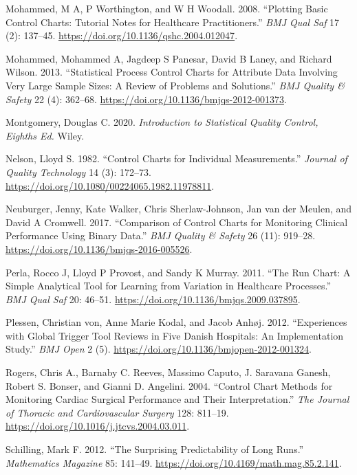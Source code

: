 \documentclass[
]{book}
\newlength{\cslhangindent}
\newenvironment{CSLReferences}[2] %
 {\begin{list}{}{%
  \setlength{\itemindent}{0pt}
  \setlength{\leftmargin}{0pt}
  \setlength{\parsep}{0pt}
  \ifodd #1
   \setlength{\leftmargin}{\cslhangindent}
   \setlength{\itemindent}{-1\cslhangindent}
  \fi
  \setlength{\itemsep}{#2\baselineskip}}}
 {\end{list}}
\begin{document}
\begin{CSLReferences}{1}{1}
Mohammed, M A, P Worthington, and W H Woodall. 2008. {``Plotting Basic Control Charts: Tutorial Notes for Healthcare Practitioners.''} \emph{BMJ Qual Saf} 17 (2): 137--45. \url{https://doi.org/10.1136/qshc.2004.012047}.

Mohammed, Mohammed A, Jagdeep S Panesar, David B Laney, and Richard Wilson. 2013. {``Statistical Process Control Charts for Attribute Data Involving Very Large Sample Sizes: A Review of Problems and Solutions.''} \emph{BMJ Quality \& Safety} 22 (4): 362--68. \url{https://doi.org/10.1136/bmjqs-2012-001373}.

Montgomery, Douglas C. 2020. \emph{Introduction to Statistical Quality Control, Eighths Ed.} Wiley.

Nelson, Lloyd S. 1982. {``Control Charts for Individual Measurements.''} \emph{Journal of Quality Technology} 14 (3): 172--73. \url{https://doi.org/10.1080/00224065.1982.11978811}.

Neuburger, Jenny, Kate Walker, Chris Sherlaw-Johnson, Jan van der Meulen, and David A Cromwell. 2017. {``Comparison of Control Charts for Monitoring Clinical Performance Using Binary Data.''} \emph{BMJ Quality \& Safety} 26 (11): 919--28. \url{https://doi.org/10.1136/bmjqs-2016-005526}.

Perla, Rocco J, Lloyd P Provost, and Sandy K Murray. 2011. {``The Run Chart: A Simple Analytical Tool for Learning from Variation in Healthcare Processes.''} \emph{BMJ Qual Saf} 20: 46--51. \url{https://doi.org/10.1136/bmjqs.2009.037895}.

Plessen, Christian von, Anne Marie Kodal, and Jacob Anhøj. 2012. {``Experiences with Global Trigger Tool Reviews in Five Danish Hospitals: An Implementation Study.''} \emph{BMJ Open} 2 (5). \url{https://doi.org/10.1136/bmjopen-2012-001324}.

Rogers, Chris A., Barnaby C. Reeves, Massimo Caputo, J. Saravana Ganesh, Robert S. Bonser, and Gianni D. Angelini. 2004. {``Control Chart Methods for Monitoring Cardiac Surgical Performance and Their Interpretation.''} \emph{The Journal of Thoracic and Cardiovascular Surgery} 128: 811--19. \url{https://doi.org/10.1016/j.jtcvs.2004.03.011}.

Schilling, Mark F. 2012. {``The Surprising Predictability of Long Runs.''} \emph{Mathematics Magazine} 85: 141--49. \url{https://doi.org/10.4169/math.mag.85.2.141}.


\end{CSLReferences}
\end{document}
